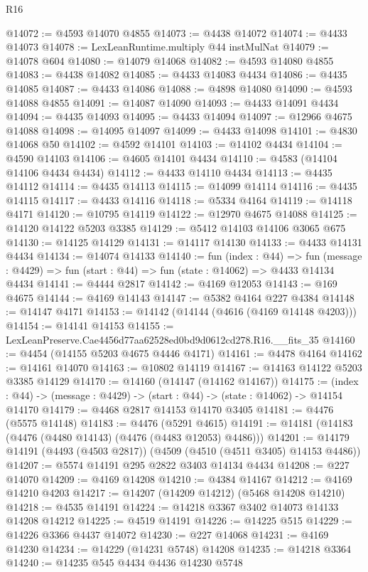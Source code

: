 \begin{lexlean}{R16}
\begin{coremodule}
@14072 := @4593 @14070 @4855
@14073 := @4438 @14072
@14074 := @4433 @14073
@14078 := LexLeanRuntime.multiply @44 instMulNat
@14079 := @14078 @604
@14080 := @14079 @14068
@14082 := @4593 @14080 @4855
@14083 := @4438 @14082
@14085 := @4433 @14083 @4434
@14086 := @4435 @14085
@14087 := @4433 @14086
@14088 := @4898 @14080
@14090 := @4593 @14088 @4855
@14091 := @14087 @14090
@14093 := @4433 @14091 @4434
@14094 := @4435 @14093
@14095 := @4433 @14094
@14097 := @12966 @4675 @14088
@14098 := @14095 @14097
@14099 := @4433 @14098
@14101 := @4830 @14068 @50
@14102 := @4592 @14101
@14103 := @14102 @4434
@14104 := @4590 @14103
@14106 := @4605 @14101 @4434
@14110 := @4583 (@14104 @14106 @4434 @4434)
@14112 := @4433 @14110 @4434
@14113 := @4435 @14112
@14114 := @4435 @14113
@14115 := @14099 @14114
@14116 := @4435 @14115
@14117 := @4433 @14116
@14118 := @5334 @4164
@14119 := @14118 @4171
@14120 := @10795 @14119
@14122 := @12970 @4675 @14088
@14125 := @14120 @14122 @5203 @3385
@14129 := @5412 @14103 @14106 @3065 @675
@14130 := @14125 @14129
@14131 := @14117 @14130
@14133 := @4433 @14131 @4434
@14134 := @14074 @14133
@14140 := fun (index : @44) =>
  fun (message : @4429) => fun (start : @44) => fun (state : @14062) => @4433 @14134 @4434
@14141 := @4444 @2817
@14142 := @4169 @12053
@14143 := @169 @4675
@14144 := @4169 @14143
@14147 := @5382 @4164 @227 @4384
@14148 := @14147 @4171
@14153 := @14142 (@14144 (@4616 (@4169 @14148 @4203)))
@14154 := @14141 @14153
@14155 := LexLeanPreserve.Cae4456d77aa62528ed0bd9d0612cd278.R16.__fits_35
@14160 := @4454 (@14155 @5203 @4675 @4446 @4171)
@14161 := @4478 @4164
@14162 := @14161 @14070
@14163 := @10802 @14119
@14167 := @14163 @14122 @5203 @3385 @14129
@14170 := @14160 (@14147 (@14162 @14167))
@14175 := (index : @44) -> (message : @4429) -> (start : @44) -> (state : @14062) -> @14154 @14170
@14179 := @4468 @2817 @14153 @14170 @3405
@14181 := @4476 (@5575 @14148)
@14183 := @4476 (@5291 @4615)
@14191 := @14181 (@14183 (@4476 (@4480 @14143) (@4476 (@4483 @12053) @4486)))
@14201 := @14179 @14191 (@4493 (@4503 @2817)) (@4509 (@4510 (@4511 @3405) @14153 @4486))
@14207 := @5574 @14191 @295 @2822 @3403 @14134 @4434
@14208 := @227 @14070
@14209 := @4169 @14208
@14210 := @4384 @14167
@14212 := @4169 @14210 @4203
@14217 := @14207 (@14209 @14212) (@5468 @14208 @14210)
@14218 := @4535 @14191
@14224 := @14218 @3367 @3402 @14073 @14133 @14208 @14212
@14225 := @4519 @14191
@14226 := @14225 @515
@14229 := @14226 @3366 @4437 @14072
@14230 := @227 @14068
@14231 := @4169 @14230
@14234 := @14229 (@14231 @5748) @14208
@14235 := @14218 @3364
@14240 := @14235 @545 @4434 @4436 @14230 @5748

\end{coremodule}
\end{lexlean}
